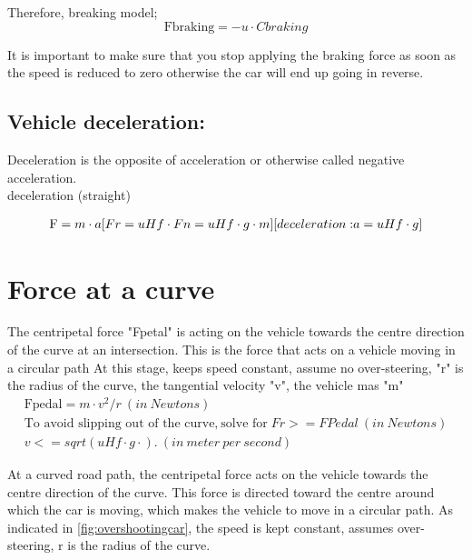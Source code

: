 \documentclass{book}
\begin{document}
Therefore, breaking model;
\begin{equation}
\mbox{Fbraking} = -u \cdot Cbraking
\end{equation}

It is important to make sure that you stop applying the braking force as soon as the speed is reduced to zero otherwise the car will end up going in reverse.

\subsection{Vehicle deceleration:} Deceleration is the opposite of acceleration or otherwise called negative acceleration.\\
deceleration (straight)

\begin{eqnarray}
\mbox{F}  = m \cdot a
\mbox[{Fr}  = uHf\cdot Fn = uHf\cdot g \cdot m]  %
\mbox[{deceleration:}  a = uHf \cdot g] %
\end{eqnarray}




\section{Force at a curve}

The centripetal force "Fpetal" is acting on the vehicle towards the centre direction of the curve at an intersection. This is the force that acts on a vehicle moving in a circular path
At this stage, keeps speed constant, assume no over-steering, "r" is the radius of the curve, the tangential velocity "v", the vehicle mas "m"
\begin{eqnarray}
\mbox{Fpedal} = m \cdot v^2/r  \ (in \ Newtons) \\
\mbox{To avoid slipping out of the curve,} \
\mbox{solve for} \; Fr >= FPedal  \ (in \ Newtons)\\
 v <= sqrt (uHf \cdot g \cdot). \ (in \ meter \ per \ second)
 \end{eqnarray}


At a curved road path, the centripetal force acts on the vehicle towards the centre direction of the curve. This force is directed toward the centre around which the car is moving, which makes the vehicle to move in a circular path. As indicated in \ref{fig:overshootingcar}, the speed  is kept constant, assumes over-steering, r is the radius of the curve.
\end{document}
